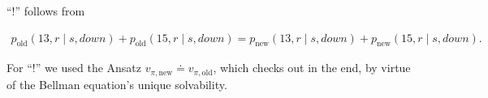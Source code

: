 \begin{solution}
\begin{enumerate}[label = \arabic*.]
    \enquote{!} follows from

    \begin{align*}
        p_\text{old}(13, r \mid s, \mathit{down})
        +
        p_\text{old}(15, r \mid s, \mathit{down})
        =
        p_\text{new}(13, r \mid s, \mathit{down})
        +
        p_\text{new}(15, r \mid s, \mathit{down}).
    \end{align*}

    For \enquote{!} we used the Ansatz $v_{\pi, \text{new}} \doteq v_{\pi, \text{old}}$, which checks out in the end, by virtue of the Bellman equation's unique solvability.

\end{enumerate}

\end{solution}

